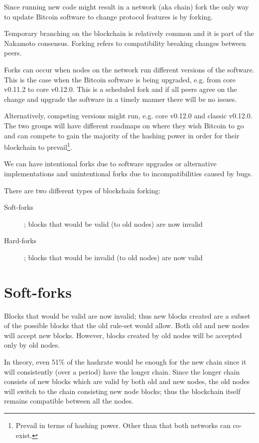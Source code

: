Since running new code might result in a network (aka chain) fork the only way to update Bitcoin software to change protocol features is by forking.

\begin{note}
Temporary branching on the blockchain is relatively common and it is part of the Nakamoto consensus. Forking refers to compatibility breaking changes between peers.
\end{note}

Forks can occur when nodes on the network run different versions of the software. This is the case when the Bitcoin software is being upgraded, e.g. from core v0.11.2 to core v0.12.0. This is a scheduled fork and if all peers agree on the change and upgrade the software in a timely manner there will be no issues.

Alternatively, competing versions might run, e.g. core v0.12.0 and classic v0.12.0. The two groups will have different roadmaps on where they wish Bitcoin to go and can compete to gain the majority of the hashing power in order for their blockchain to prevail\footnote{Prevail in terms of hashing power. Other than that both networks can co-exist.}.

We can have intentional forks due to software upgrades or alternative implementations and unintentional forks due to incompatibilities caused by bugs.

There are two different types of blockchain forking:
\begin{description}
\item[Soft-forks]; blocks that would be valid (to old nodes) are now invalid
\item[Hard-forks]; blocks that would be invalid (to old nodes) are now valid
\end{description}


\section{Soft-forks}
Blocks that would be valid are now invalid; thus new blocks created are a subset of the possible blocks that the old rule-set would allow. Both old and new nodes will accept new blocks. However, blocks created by old nodes will be accepted only by old nodes.

In theory, even 51\% of the hashrate would be enough for the new chain since it will consistently (over a period) have the longer chain. Since the longer chain consists of new blocks which are valid by both old and new nodes, the old nodes will switch to the chain consisting new node blocks; thus the blockchain itself remains compatible between all the nodes.

